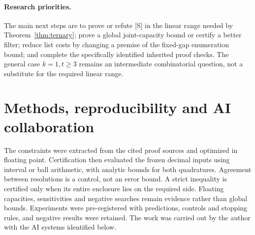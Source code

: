 \documentclass[11pt]{article}
\theoremstyle{plain}
\begin{document}
\begin{enumerate}
\end{enumerate}

\paragraph{Research priorities.}
The main next steps are to prove or refute [S] in the linear range needed by Theorem~\ref{thm:ternary}; prove a global joint-capacity bound or certify a better filter; reduce list costs by changing a premise of the fixed-gap enumeration bound; and complete the specifically identified inherited proof checks. The general case $k=1,t\ge3$ remains an intermediate combinatorial question, not a substitute for the required linear range.

\section{Methods, reproducibility and AI collaboration}

The constraints were extracted from the cited proof sources and optimized in floating point. Certification then evaluated the frozen decimal inputs using interval or ball arithmetic, with analytic bounds for both quadratures. Agreement between resolutions is a control, not an error bound. A strict inequality is certified only when its entire enclosure lies on the required side. Floating capacities, sensitivities and negative searches remain evidence rather than global bounds. Experiments were pre-registered with predictions, controls and stopping rules, and negative results were retained. The work was carried out by the author with the AI systems identified below.
\end{document}
